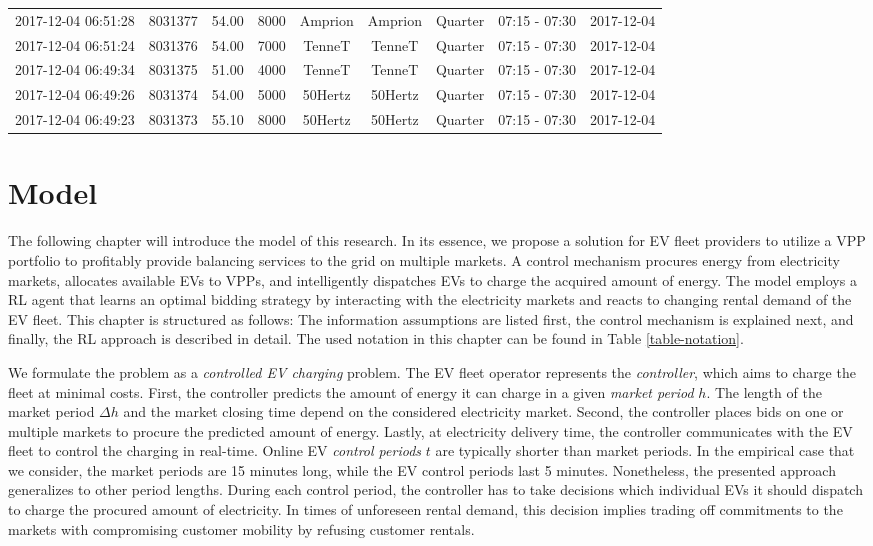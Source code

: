 \documentclass[a4paper, 12pt]{article}
\begin{document}
{\begin{table}
\begin{tabular}{c|cccccccc}
2017-12-04 06:51:28 & 8031377 & 54.00 & 8000 & Amprion & Amprion & Quarter & 07:15 - 07:30 & 2017-12-04\\
2017-12-04 06:51:24 & 8031376 & 54.00 & 7000 & TenneT & TenneT & Quarter & 07:15 - 07:30 & 2017-12-04\\
2017-12-04 06:49:34 & 8031375 & 51.00 & 4000 & TenneT & TenneT & Quarter & 07:15 - 07:30 & 2017-12-04\\
2017-12-04 06:49:26 & 8031374 & 54.00 & 5000 & 50Hertz & 50Hertz & Quarter & 07:15 - 07:30 & 2017-12-04\\
2017-12-04 06:49:23 & 8031373 & 55.10 & 8000 & 50Hertz & 50Hertz & Quarter & 07:15 - 07:30 & 2017-12-04\\
\hline
\hline
\end{tabular}
\end{table}
}

\clearpage

\section{Model}
\label{sec:orga2ead60}
The following chapter will introduce the model of this research. In its essence,
we propose a solution for EV fleet providers to utilize a VPP portfolio to
profitably provide balancing services to the grid on multiple markets. A control
mechanism procures energy from electricity markets, allocates available EVs to
VPPs, and intelligently dispatches EVs to charge the acquired amount of energy.
The model employs a RL agent that learns an optimal bidding strategy by
interacting with the electricity markets and reacts to changing rental demand of
the EV fleet. This chapter is structured as follows: The information assumptions
are listed first, the control mechanism is explained next, and finally, the RL
approach is described in detail. The used notation in this chapter can be found
in Table \ref{table-notation}.

We formulate the problem as a \emph{controlled EV charging} problem. The EV fleet
operator represents the \emph{controller}, which aims to charge the fleet at minimal
costs. First, the controller predicts the amount of energy it can charge in a
given \emph{market period} \(h\). The length of the market period \(\Delta h\) and the
market closing time depend on the considered electricity market. Second, the
controller places bids on one or multiple markets to procure the predicted
amount of energy. Lastly, at electricity delivery time, the controller
communicates with the EV fleet to control the charging in real-time. Online EV
\emph{control periods} \(t\) are typically shorter than market periods. In the
empirical case that we consider, the market periods are 15 minutes long, while
the EV control periods last 5 minutes. Nonetheless, the presented approach
generalizes to other period lengths. During each control period, the controller
has to take decisions which individual EVs it should dispatch to charge the
procured amount of electricity. In times of unforeseen rental demand, this
decision implies trading off commitments to the markets with compromising
customer mobility by refusing customer rentals.
\end{document}
